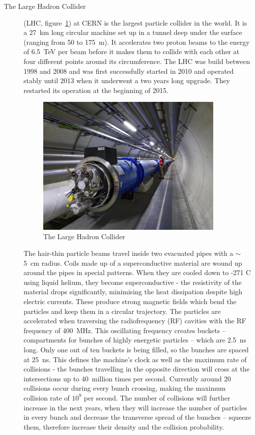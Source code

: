 \begin{description}
\item[The Large Hadron Collider]
(LHC, figure~\ref{fig:lhc}) at CERN is the largest particle collider in the world. It is a 27~km long circular machine set up in a tunnel deep under the surface (ranging from 50 to 175~m). It accelerates two proton beams to the energy of 6.5~TeV per beam before it makes them to collide with each other at four different points around its circumference. The LHC was build between 1998 and 2008 and was first successfully started in 2010 and operated stably until 2013 when it underwent a two years long upgrade. They restarted its operation at the beginning of 2015.
\begin{figure}[!t]
\centering
\includegraphics[width=0.9\textwidth]{01_introduction/pics/lhc}
\caption{The Large Hadron Collider \cite{Maximilien:1324852}}
\label{fig:lhc}
\end{figure}
The hair-thin particle beams travel inside two evacuated pipes with a $\sim$5~cm radius. Coils made up of a superconductive material are wound up around the pipes in special patterns. When they are cooled down to -271 \textdegree C using liquid helium, they become superconductive - the resistivity of the material drops significantly, minimising the heat dissipation despite high electric currents. These produce strong magnetic fields which bend the particles and keep them in a circular trajectory. The particles are accelerated when traversing the radiofrequency (RF) cavities with the RF frequency of 400~MHz. This oscillating frequency creates buckets -- compartments for bunches of highly energetic particles -- which are 2.5~ns long. Only one out of ten buckets is being filled, so the bunches are spaced at 25~ns. This defines the machine's clock as well as the maximum rate of collisions - the bunches travelling in the opposite direction will cross at the intersections up to 40~million times per second. Currently around 20 collisions occur during every bunch crossing, making the maximum collision rate of $10^9$ per second. The number of collisions will further increase in the next years, when they will increase the number of particles in every bunch and decrease the transverse spread of the bunches -- squeeze them, therefore increase their density and the collision probability.
\end{description}


